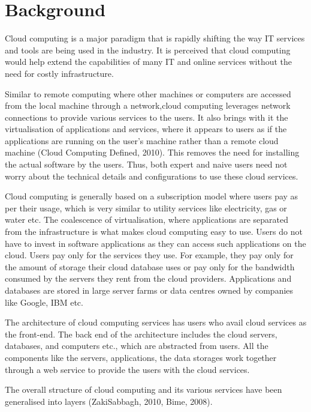 \chapter{Background}



Cloud computing is a major paradigm that is rapidly shifting the way \ac{IT}
services and tools are being used in the industry. It is perceived that cloud
computing would help extend the capabilities of many \ac{IT} and online services
without the need for costly infrastructure.

Similar to remote computing where other machines or computers are accessed from
the local machine through a network,cloud computing leverages network
connections to provide various services to the users. It also brings with it the
virtualisation of applications and services, where it appears to users as if the
applications are running on the user's machine rather than a remote cloud
machine (Cloud Computing Defined, 2010). This removes the need for installing the actual
software by the users. Thus, both expert and naive users need not worry about
the technical details and configurations to use these cloud services.

Cloud computing is generally based on a subscription model where users pay as
per their usage, which is very similar to utility services like electricity, gas
or water etc. The coalescence of virtualisation, where applications are
separated from the infrastructure is what makes cloud computing easy to use.
Users do not have to invest in software applications as they can access
such applications on the cloud. Users pay only for the services they use. For
example, they pay only for the amount of storage their cloud database uses or
pay only for the bandwidth consumed by the servers they rent from the cloud
providers. Applications and databases are stored in large server farms or data
centres owned by companies like Google, IBM etc.

The architecture of cloud computing services has users who avail cloud services
as the front-end. The back end of the architecture includes the cloud servers,
databases, and computers etc., which are abstracted from users. All
the components like the servers, applications, the data storages work together
through a web service to provide the users with the cloud services.

The overall structure of cloud computing and its various services have been
generalised into layers (ZakiSabbagh, 2010, Bime, 2008).

